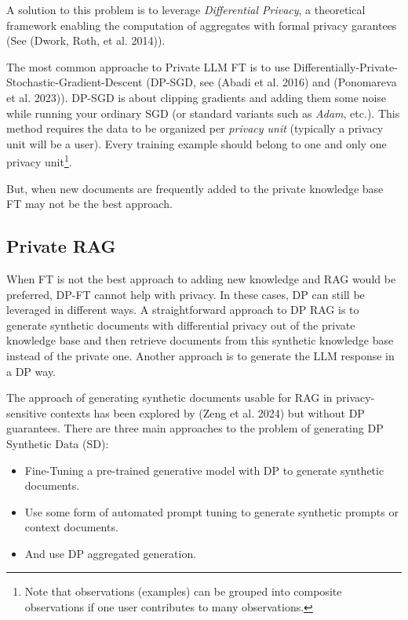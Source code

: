 \documentclass[
  12pt,
  a4paper,
]{article}
\providecommand{\tightlist}{%
  \setlength{\itemsep}{0pt}\setlength{\parskip}{0pt}}
\begin{document}
A solution to this problem is to leverage \emph{Differential Privacy}, a
theoretical framework enabling the computation of aggregates with formal
privacy garantees (See (Dwork, Roth, et al. 2014)).

The most common approache to Private LLM FT is to use
Differentially-Private-Stochastic-Gradient-Descent (DP-SGD, see (Abadi
et al. 2016) and (Ponomareva et al. 2023)). DP-SGD is about clipping
gradients and adding them some noise while running your ordinary SGD (or
standard variants such as \emph{Adam}, etc.). This method requires the
data to be organized per \emph{privacy unit} (typically a privacy unit
will be a user). Every training example should belong to one and only
one privacy unit\footnote{Note that observations (examples) can be
  grouped into composite observations if one user contributes to many
  observations.}.

But, when new documents are frequently added to the private knowledge
base FT may not be the best approach.

\subsection{Private RAG}\label{private-rag}

When FT is not the best approach to adding new knowledge and RAG would
be preferred, DP-FT cannot help with privacy. In these cases, DP can
still be leveraged in different ways. A straightforward approach to DP
RAG is to generate synthetic documents with differential privacy out of
the private knowledge base and then retrieve documents from this
synthetic knowledge base instead of the private one. Another approach is
to generate the LLM response in a DP way.

The approach of generating synthetic documents usable for RAG in
privacy-sensitive contexts has been explored by (Zeng et al. 2024) but
without DP guarantees. There are three main approaches to the problem of
generating DP Synthetic Data (SD):

\begin{itemize}
\tightlist
\item
  Fine-Tuning a pre-trained generative model with DP to generate
  synthetic documents.
\item
  Use some form of automated prompt tuning to generate synthetic prompts
  or context documents.
\item
  And use DP aggregated generation.
\end{itemize}
\end{document}
